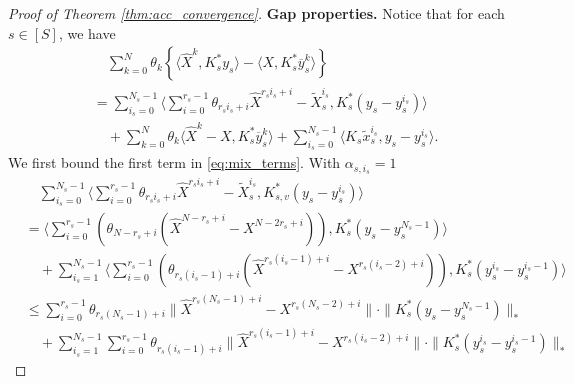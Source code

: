 \documentclass[10pt]{article}
\begin{document}
\begin{proof}[Proof of Theorem \ref{thm:acc_convergence}]
\textbf{Gap properties.} Notice that for each $s\in [S]$, we have
\begin{align}\label{eq:mix_terms2}
&\quad \sum_{k=0}^{N}\theta_k\left\{\langle \widehat{X}^{k},K^*_{s}y_s\rangle - \langle X,K^*_{s}\overline{y}_s^{k}\rangle\right\}\nonumber\\
    &= \sum_{i_s=0}^{N_s-1}\langle\sum_{i=0}^{r_s-1} \theta_{r_si_s+i}\widehat{X}^{r_si_s+i}-\widetilde{X}_{s}^{i_s},K^*_{s}(y_s-y_s^{i_s})\rangle  \nonumber\\
    &\quad +\sum_{k=0}^N \theta_k \langle \widehat{X}^{k}-X,K^*_{s}\overline{y}_s^{k}\rangle +\sum_{i_s=0}^{N_s-1} \langle K_{s}\widetilde{x}_{s}^{i_s}, y_s- y_s^{i_s}\rangle .
\end{align}
We first bound the first term in \eqref{eq:mix_terms}. With $\alpha_{s,i_s} = 1$ 
\begin{align*}
   &\quad \sum_{i_s=0}^{N_s-1}\langle\sum_{i=0}^{r_s-1} \theta_{r_si_s+i}\widehat{X}^{r_si_s+i}-\widetilde{X}_{s}^{i_s},K^*_{s,v}(y_s-y_s^{i_s})\rangle \\
   &= \langle \sum_{i=0}^{r_s-1}(\theta_{N-r_s+i}(\widehat{X}^{N-r_s+i}-X^{N-2r_s+i})) ,K^*_{s}(y_s-y_s^{N_s-1})\rangle\\
   &\quad +  \sum_{i_s=1}^{N_s-1}\langle \sum_{i=0}^{r_s-1} (\theta_{r_s(i_s-1)+i}(\widehat{X}^{r_s(i_s-1)+i}-X^{r_s(i_s-2)+i})),K^*_{s}(y_s^{i_s}-y_s^{i_s-1})\rangle\\
   &\leq \sum_{i=0}^{r_s-1} \theta_{r_s(N_s-1)+i}\|\widehat{X}^{r_s(N_s-1)+i}-X^{r_s(N_s-2)+i}\|\cdot \| K^*_{s}(y_s-y_s^{N_s-1})\|_{*} \\
   &\quad +  \sum_{i_s=1}^{N_s-1}\sum_{i=0}^{r_s-1}   \theta_{r_s(i_s-1)+i}\|\widehat{X}^{r_s(i_s-1)+i}-X^{r_s(i_s-2)+i}\|\cdot \|K^*_{s}(y_s^{i_s}-y_s^{i_s-1})\|_{*}
\end{align*}




\end{proof}
\end{document}
